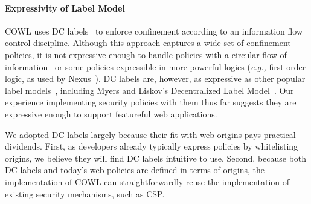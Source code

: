 
%



\paragraph{Expressivity of Label Model}
\label{sec:discussion:lattice}

COWL uses DC labels~\cite{stefan:2011:dclabels} to enforce
confinement according to an information flow control discipline.
%
Although this approach captures a wide set of confinement policies, it
is not expressive enough to handle policies with a circular flow of
information~\cite{Badger:1995} or some policies expressible in more
powerful logics (\emph{e.g.,} first order logic, as used by
Nexus~\cite{sirer2011logical}).
%
%
DC labels are, however, as expressive as other popular label
models~\cite{GenLabels}, including Myers and Liskov's Decentralized
Label Model~\cite{dlm}. Our experience implementing security policies
with them thus far suggests they are expressive enough to support
featureful web applications.

We adopted DC labels largely because their fit with web origins pays
practical dividends.
%
%
First, as developers already typically express policies by whitelisting
origins, we believe they will find DC labels intuitive to use.
%
%
%
Second, because both DC labels and today's web policies are defined in
terms of origins, the implementation of COWL can straightforwardly
reuse the implementation of existing security mechanisms, such as CSP.



